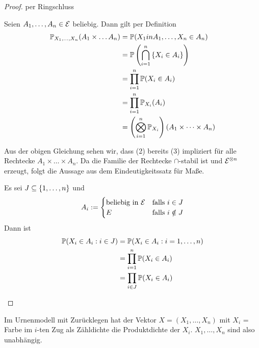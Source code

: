 \begin{proof}
	per Ringschluss 
	\begin{description}[nolistsep]
		\item [(1 $\boldsymbol{\Rightarrow}$ 2)] Seien $A_1, \dots, A_n \in \Ecal$ beliebig. Dann gilt per Definition
		\begin{equation*}
			\begin{aligned}
				\P_{X_1 , \dots , X_n}(A_1 \times \dots A_n) 
				&= \P(X_1 in A_1, \dots , X_n \in A_n) \\
				&= \P\brackets{\bigcap_{i=1}^n \menge{X_i \in A_i}} \\
				&= \prod_{i=1}^n \P(X_i \in A_i) \\
				&= \prod_{i=1}^n \P_{X_i}(A_i) \\
				&= \brackets{\bigotimes_{i=1}^n \P_{X_i}} \brackets{A_1 \times \dots \times A_n}
			\end{aligned}
		\end{equation*}
		\item [(2 $\boldsymbol{\Rightarrow}$ 3)] Aus der obigen Gleichung sehen wir, dass (2) bereits (3) impliziert für alle Rechtecke $A_1 \times \dots \times A_n$. Da die Familie der Rechtecke $\cap$-stabil ist und $\Ecal^{\otimes n}$ erzeugt, folgt die Aussage aus dem Eindeutigkeitssatz für Maße.
		\item [(3 $\boldsymbol{\Rightarrow}$ 1)] Es sei $J \subseteq \menge{1, \dots, n}$ und 
		\begin{equation*}
			A_i \defeq \begin{cases}
			\text{beliebig in } \Ecal & \text{falls } i \in J \\
			E & \text{falls } i \notin J
			\end{cases}
		\end{equation*}
		Dann ist
		\begin{equation*}
			\begin{aligned}
			\P(X_i \in A_i : i \in  J) 
			&= \P(X_i \in A_i : i = 1 , \dots , n) \\
			&= \prod_{i=1}^n \P(X_i \in A_i) \\
			&= \prod_{i \in J} \P(X_i \in A_i)
			\end{aligned}
		\end{equation*}
	\end{description}
\end{proof}

\begin{beispiel}
	Im Urnenmodell mit Zurücklegen hat der Vektor $X = (X_1, \dots , X_n)$ mit $X_i$ = Farbe im $i$-ten Zug als Zähldichte die Produktdichte der $X_i$. $X_1 , \dots , X_n$ sind also unabhängig.
\end{beispiel}